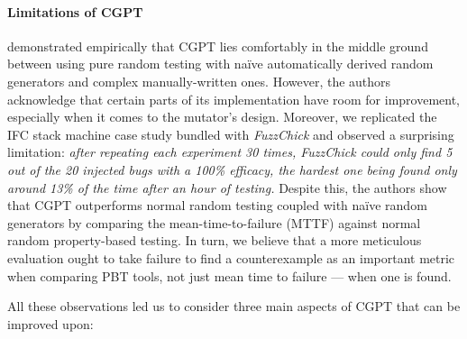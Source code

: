 \documentclass[sigconf, anonymous, review]{acmart}
\newcommand{\fuzzchick}{\textit{FuzzChick}\xspace}
\begin{document}
%
%
\paragraph{Limitations of CGPT}

\citeauthor{lampropoulos2019coverage} demonstrated empirically that CGPT lies
comfortably in the middle ground between using pure random testing with na\"ive
automatically derived random generators and complex manually-written ones.
%
%
However, the authors acknowledge that certain parts of its implementation have
room for improvement, especially when it comes to the mutator's design.
%
%
Moreover, we replicated the IFC stack machine case study bundled with \fuzzchick
and observed a surprising limitation:
%
\emph{after repeating each experiment 30 times, \fuzzchick could only find 5 out
  of the 20 injected bugs with a 100\% efficacy, the hardest one being found
  only around 13\% of the time after an hour of testing.}
%
Despite this, the authors show that CGPT outperforms normal random testing
coupled with na\"ive random generators by comparing the mean-time-to-failure
(MTTF) against normal random property-based testing.
%
In turn, we believe that a more meticulous evaluation ought to take failure to find a
counterexample as an important metric when comparing PBT tools, not just mean
time to failure --- when one is found.
%

All these observations led us to consider three main aspects of CGPT that can be
improved upon:
%
%
%
%
\end{document}
